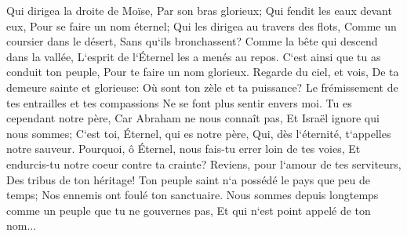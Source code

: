 \verse Qui dirigea la droite de Moïse, Par son bras glorieux; Qui fendit les eaux devant eux, Pour se faire un nom éternel; 
\verse Qui les dirigea au travers des flots, Comme un coursier dans le désert, Sans qu`ils bronchassent? 
\verse Comme la bête qui descend dans la vallée, L`esprit de l`Éternel les a menés au repos. C`est ainsi que tu as conduit ton peuple, Pour te faire un nom glorieux. 
\verse Regarde du ciel, et vois, De ta demeure sainte et glorieuse: Où sont ton zèle et ta puissance? Le frémissement de tes entrailles et tes compassions Ne se font plus sentir envers moi. 
\verse Tu es cependant notre père, Car Abraham ne nous connaît pas, Et Israël ignore qui nous sommes; C`est toi, Éternel, qui es notre père, Qui, dès l`éternité, t`appelles notre sauveur. 
\verse Pourquoi, ô Éternel, nous fais-tu errer loin de tes voies, Et endurcis-tu notre coeur contre ta crainte? Reviens, pour l`amour de tes serviteurs, Des tribus de ton héritage! 
\verse Ton peuple saint n`a possédé le pays que peu de temps; Nos ennemis ont foulé ton sanctuaire. 
\verse Nous sommes depuis longtemps comme un peuple que tu ne gouvernes pas, Et qui n`est point appelé de ton nom... 

